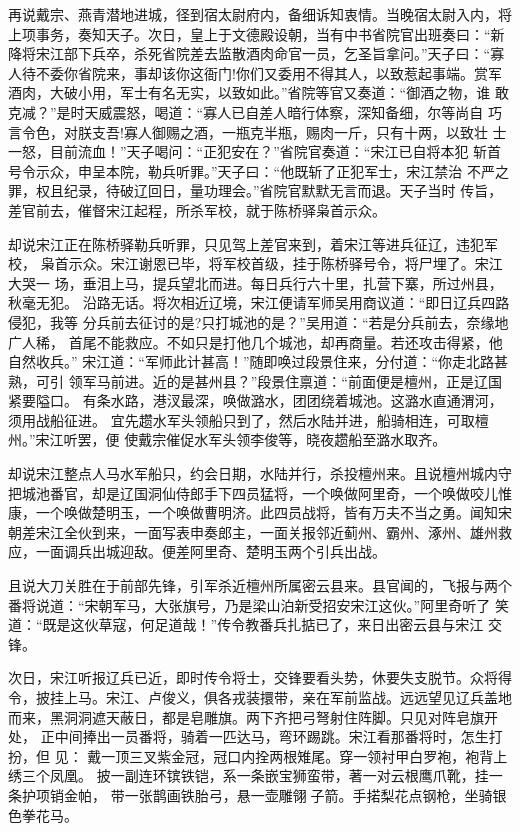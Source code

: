 再说戴宗、燕青潜地进城，径到宿太尉府内，备细诉知衷情。当晚宿太尉入内，将
上项事务，奏知天子。次日，皇上于文德殿设朝，当有中书省院官出班奏曰：“新
降将宋江部下兵卒，杀死省院差去监散酒肉命官一员，乞圣旨拿问。”天子曰：“寡
人待不委你省院来，事却该你这衙门!你们又委用不得其人，以致惹起事端。赏军
酒肉，大破小用，军士有名无实，以致如此。”省院等官又奏道：“御酒之物，谁
敢克减？”是时天威震怒，喝道：“寡人已自差人暗行体察，深知备细，尔等尚自
巧言令色，对朕支吾!寡人御赐之酒，一瓶克半瓶，赐肉一斤，只有十两，以致壮
士一怒，目前流血！”天子喝问：“正犯安在？”省院官奏道：“宋江已自将本犯
斩首号令示众，申呈本院，勒兵听罪。”天子曰：“他既斩了正犯军士，宋江禁治
不严之罪，权且纪录，待破辽回日，量功理会。”省院官默默无言而退。天子当时
传旨，差官前去，催督宋江起程，所杀军校，就于陈桥驿枭首示众。

却说宋江正在陈桥驿勒兵听罪，只见驾上差官来到，着宋江等进兵征辽，违犯军校，
枭首示众。宋江谢恩已毕，将军校首级，挂于陈桥驿号令，将尸埋了。宋江大哭一
场，垂泪上马，提兵望北而进。每日兵行六十里，扎营下寨，所过州县，秋毫无犯。
沿路无话。将次相近辽境，宋江便请军师吴用商议道：“即日辽兵四路侵犯，我等
分兵前去征讨的是?只打城池的是？”吴用道：“若是分兵前去，奈缘地广人稀，
首尾不能救应。不如只是打他几个城池，却再商量。若还攻击得紧，他自然收兵。”
宋江道：“军师此计甚高！”随即唤过段景住来，分付道：“你走北路甚熟，可引
领军马前进。近的是甚州县？”段景住禀道：“前面便是檀州，正是辽国紧要隘口。
有条水路，港汊最深，唤做潞水，团团绕着城池。这潞水直通渭河，须用战船征进。
宜先趱水军头领船只到了，然后水陆并进，船骑相连，可取檀州。”宋江听罢，便
使戴宗催促水军头领李俊等，晓夜趱船至潞水取齐。

却说宋江整点人马水军船只，约会日期，水陆并行，杀投檀州来。且说檀州城内守
把城池番官，却是辽国洞仙侍郎手下四员猛将，一个唤做阿里奇，一个唤做咬儿惟
康，一个唤做楚明玉，一个唤做曹明济。此四员战将，皆有万夫不当之勇。闻知宋
朝差宋江全伙到来，一面写表申奏郎主，一面关报邻近蓟州、霸州、涿州、雄州救
应，一面调兵出城迎敌。便差阿里奇、楚明玉两个引兵出战。

且说大刀关胜在于前部先锋，引军杀近檀州所属密云县来。县官闻的，飞报与两个
番将说道：“宋朝军马，大张旗号，乃是梁山泊新受招安宋江这伙。”阿里奇听了
笑道：“既是这伙草寇，何足道哉！”传令教番兵扎掂已了，来日出密云县与宋江
交锋。

次日，宋江听报辽兵已近，即时传令将士，交锋要看头势，休要失支脱节。众将得
令，披挂上马。宋江、卢俊义，俱各戎装擐带，亲在军前监战。远远望见辽兵盖地
而来，黑洞洞遮天蔽日，都是皂雕旗。两下齐把弓弩射住阵脚。只见对阵皂旗开处，
正中间捧出一员番将，骑着一匹达马，弯环踢跳。宋江看那番将时，怎生打扮，但
见：
戴一顶三叉紫金冠，冠口内拴两根雉尾。穿一领衬甲白罗袍，袍背上绣三个凤凰。
披一副连环镔铁铠，系一条嵌宝狮蛮带，著一对云根鹰爪靴，挂一条护项销金帕，
带一张鹊画铁胎弓，悬一壶雕翎子箭。手掿梨花点钢枪，坐骑银色拳花马。

